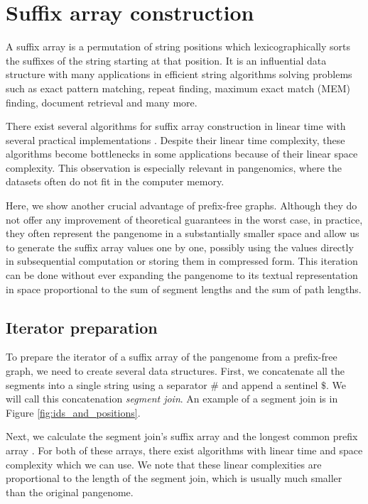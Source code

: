 \section{Suffix array construction}
A suffix array is a permutation of string positions which lexicographically sorts the suffixes of the string starting at that position.
It is an influential data structure with many applications in efficient string algorithms solving problems such as exact pattern matching, repeat finding, maximum exact match (MEM) finding, document retrieval and many more.

There exist several algorithms for suffix array construction in linear time \cite{skew2003karkkainen,sais2009nong,saoverview2007puglisi} with several practical implementations \cite{louza2017inducing,libdivsufsort}.
Despite their linear time complexity, these algorithms become bottlenecks in some applications because of their linear space complexity.
This observation is especially relevant in pangenomics, where the datasets often do not fit in the computer memory.

Here, we show another crucial advantage of prefix-free graphs.
Although they do not offer any improvement of theoretical guarantees in the worst case, in practice, they often represent the pangenome in a substantially smaller space and allow us to generate the suffix array values one by one, possibly using the values directly in subsequential computation or storing them in compressed form.
This iteration can be done without ever expanding the pangenome to its textual representation in space proportional to the sum of segment lengths and the sum of path lengths.

\subsection{Iterator preparation}
To prepare the iterator of a suffix array of the pangenome from a prefix-free graph, we need to create several data structures.
First, we concatenate all the segments into a single string using a separator $\texttt{\#}$ and append a sentinel $\texttt{\$}$.
We will call this concatenation \emph{segment join}.
An example of a segment join is in Figure \ref{fig:ids_and_positions}.

Next, we calculate the segment join's suffix array and the longest common prefix array \cite{landau2001linear,manzini2004two}.
For both of these arrays, there exist algorithms with linear time and space complexity which we can use.
We note that these linear complexities are proportional to the length of the segment join, which is usually much smaller than the original pangenome.

